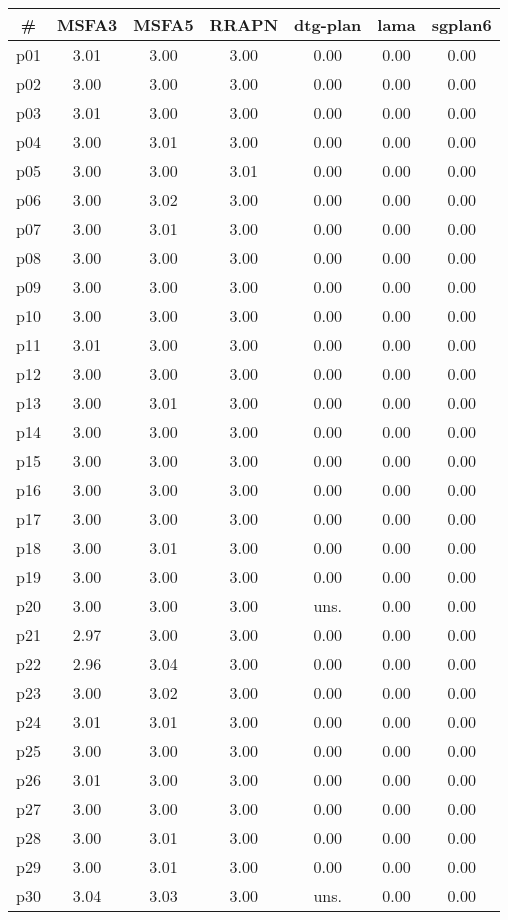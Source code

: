 \begin{tabular}{ccccccc}
\toprule
\textbf{\#} & \textbf{MSFA3} & \textbf{MSFA5} & \textbf{RRAPN} & \textbf{dtg-plan} & \textbf{lama} & \textbf{sgplan6}\\
\midrule
p01 & 3.01 & 3.00 & 3.00 & 0.00 & 0.00 & 0.00\\
p02 & 3.00 & 3.00 & 3.00 & 0.00 & 0.00 & 0.00\\
p03 & 3.01 & 3.00 & 3.00 & 0.00 & 0.00 & 0.00\\
p04 & 3.00 & 3.01 & 3.00 & 0.00 & 0.00 & 0.00\\
p05 & 3.00 & 3.00 & 3.01 & 0.00 & 0.00 & 0.00\\
p06 & 3.00 & 3.02 & 3.00 & 0.00 & 0.00 & 0.00\\
p07 & 3.00 & 3.01 & 3.00 & 0.00 & 0.00 & 0.00\\
p08 & 3.00 & 3.00 & 3.00 & 0.00 & 0.00 & 0.00\\
p09 & 3.00 & 3.00 & 3.00 & 0.00 & 0.00 & 0.00\\
p10 & 3.00 & 3.00 & 3.00 & 0.00 & 0.00 & 0.00\\
p11 & 3.01 & 3.00 & 3.00 & 0.00 & 0.00 & 0.00\\
p12 & 3.00 & 3.00 & 3.00 & 0.00 & 0.00 & 0.00\\
p13 & 3.00 & 3.01 & 3.00 & 0.00 & 0.00 & 0.00\\
p14 & 3.00 & 3.00 & 3.00 & 0.00 & 0.00 & 0.00\\
p15 & 3.00 & 3.00 & 3.00 & 0.00 & 0.00 & 0.00\\
p16 & 3.00 & 3.00 & 3.00 & 0.00 & 0.00 & 0.00\\
p17 & 3.00 & 3.00 & 3.00 & 0.00 & 0.00 & 0.00\\
p18 & 3.00 & 3.01 & 3.00 & 0.00 & 0.00 & 0.00\\
p19 & 3.00 & 3.00 & 3.00 & 0.00 & 0.00 & 0.00\\
p20 & 3.00 & 3.00 & 3.00 & uns. & 0.00 & 0.00\\
p21 & 2.97 & 3.00 & 3.00 & 0.00 & 0.00 & 0.00\\
p22 & 2.96 & 3.04 & 3.00 & 0.00 & 0.00 & 0.00\\
p23 & 3.00 & 3.02 & 3.00 & 0.00 & 0.00 & 0.00\\
p24 & 3.01 & 3.01 & 3.00 & 0.00 & 0.00 & 0.00\\
p25 & 3.00 & 3.00 & 3.00 & 0.00 & 0.00 & 0.00\\
p26 & 3.01 & 3.00 & 3.00 & 0.00 & 0.00 & 0.00\\
p27 & 3.00 & 3.00 & 3.00 & 0.00 & 0.00 & 0.00\\
p28 & 3.00 & 3.01 & 3.00 & 0.00 & 0.00 & 0.00\\
p29 & 3.00 & 3.01 & 3.00 & 0.00 & 0.00 & 0.00\\
p30 & 3.04 & 3.03 & 3.00 & uns. & 0.00 & 0.00\\
\bottomrule
\end{tabular}

